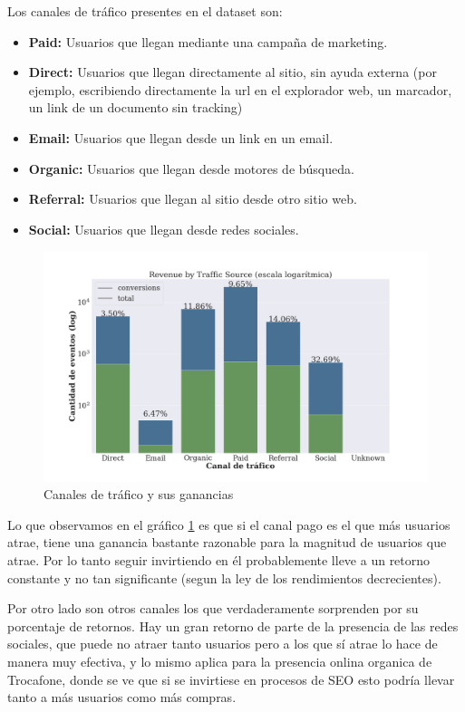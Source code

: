 \documentclass[a4paper]{article}
\begin{document}
Los canales de tráfico presentes en el dataset son:
\begin{itemize}
\item \textbf{Paid: } Usuarios que llegan mediante una campaña de marketing.
\item \textbf{Direct: } Usuarios que llegan directamente al sitio, sin ayuda externa (por ejemplo, escribiendo directamente la url en el explorador web, un marcador, un link de un documento sin tracking)
\item \textbf{Email: } Usuarios que llegan desde un link en un email.
\item \textbf{Organic: } Usuarios que llegan desde motores de búsqueda.
\item \textbf{Referral: } Usuarios que llegan al sitio desde otro sitio web.
\item \textbf{Social: } Usuarios que llegan desde redes sociales.
\end{itemize}

\begin{figure}[h!]
	\includegraphics[width=\linewidth]{figures/180-revenue_traffic-boxplot.png}
	\caption{Canales de tráfico y sus ganancias}
	\label{fig:traffic}
\end{figure}

Lo que observamos en el gráfico \ref{fig:traffic} es que si el canal pago es el que más usuarios atrae, tiene una ganancia bastante razonable para la magnitud de usuarios que atrae. Por lo tanto seguir invirtiendo en él probablemente lleve a un retorno constante y no tan significante (segun la ley de los rendimientos decrecientes). 

Por otro lado son otros canales los que verdaderamente sorprenden por su porcentaje de retornos. Hay un gran retorno de parte de la presencia de las redes sociales, que puede no atraer tanto usuarios pero a los que sí atrae lo hace de manera muy efectiva, y lo mismo aplica para la presencia onlina organica de Trocafone, donde se ve que si se invirtiese en procesos de SEO esto podría llevar tanto a más usuarios como más compras.
\end{document}
